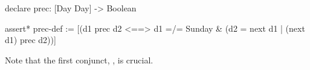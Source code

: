 %
%
\begin{tcAthena}
declare prec: [Day Day] -> Boolean

assert* prec-def := [(d1 prec d2 <==>
                     d1 =/= Sunday & (d2 = next d1 | (next d1) prec d2))]
\end{tcAthena}
Note that the first conjunct, , is crucial.
